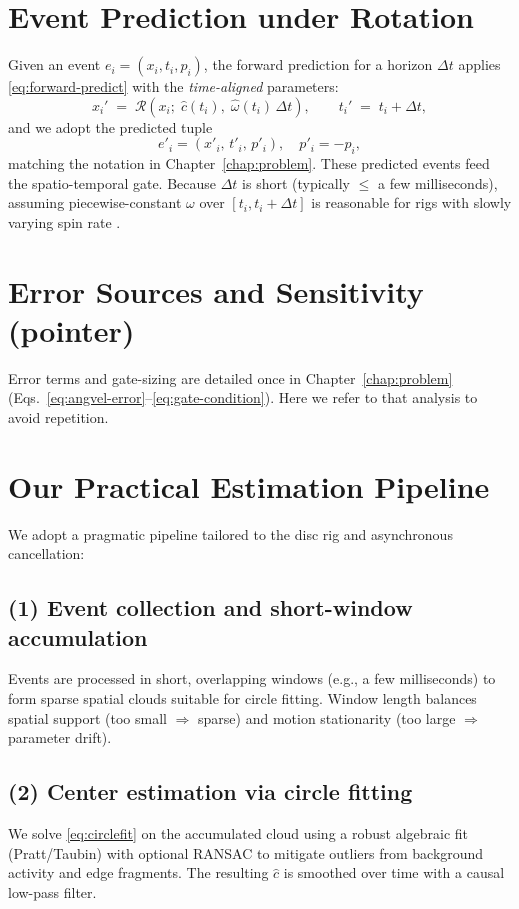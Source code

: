 \section{Event Prediction under Rotation}
Given an event $e_i=(x_i,t_i,p_i)$, the forward prediction for a horizon $\Delta t$ applies \eqref{eq:forward-predict} with the \emph{time-aligned} parameters:
\begin{equation}
x_i' \;=\; \mathcal{R}\!\left(x_i;\;\hat c(t_i),\;\hat\omega(t_i)\,\Delta t\right), 
\qquad t_i' \;=\; t_i + \Delta t,
\label{eq:per-event-predict}
\end{equation}
and we adopt the predicted tuple
\[
e'_i = (x'_i,\,t'_i,\,p'_i),\quad p'_i = -p_i,
\]
matching the notation in Chapter~\ref{chap:problem}. These predicted events feed the spatio-temporal gate. Because $\Delta t$ is short (typically $\leq$ a few milliseconds), assuming piecewise-constant $\omega$ over $[t_i,t_i+\Delta t]$ is reasonable for rigs with slowly varying spin rate \cite{Gallego2017Angular,Scheerlinck2021Thesis}.

\section{Error Sources and Sensitivity (pointer)}
Error terms and gate-sizing are detailed once in Chapter~\ref{chap:problem} (Eqs.~\eqref{eq:angvel-error}--\eqref{eq:gate-condition}). Here we refer to that analysis to avoid repetition.

\section{Our Practical Estimation Pipeline}
\label{sec:our-pipeline}
We adopt a pragmatic pipeline tailored to the disc rig and asynchronous cancellation:

\subsection*{(1) Event collection and short-window accumulation}
Events are processed in short, overlapping windows (e.g., a few milliseconds) to form sparse spatial clouds suitable for circle fitting. Window length balances spatial support (too small $\Rightarrow$ sparse) and motion stationarity (too large $\Rightarrow$ parameter drift).

\subsection*{(2) Center estimation via circle fitting}
We solve \eqref{eq:circlefit} on the accumulated cloud using a robust algebraic fit (Pratt/Taubin) with optional RANSAC to mitigate outliers from background activity and edge fragments. The resulting $\hat c$ is smoothed over time with a causal low-pass filter.

